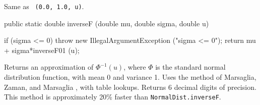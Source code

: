 \begin{tabb} 
  Same as ~\texttt{(0.0, 1.0, u)}.
\end{tabb}
\begin{code}

   public static double inverseF (double mu, double sigma, double u) 
\begin{hide} {
      if (sigma <= 0)
         throw new IllegalArgumentException ("sigma <= 0");
      return mu + sigma*inverseF01 (u);
   }\end{hide}
\end{code}
  \begin{tabb}  
  Returns an approximation of $\Phi^{-1}(u)$, where $\Phi$ is the standard
  normal distribution function, with mean 0 and variance 1.
  Uses the method of Marsaglia, Zaman, and Marsaglia \cite{rMAR94b},
  with table lookups. 
  Returns 6 decimal digits of precision. This method is approximately 
  20\%{} faster than \texttt{NormalDist.inverseF}.
 \end{tabb}
\begin{code}\begin{hide} 
}\end{hide}
\end{code}
